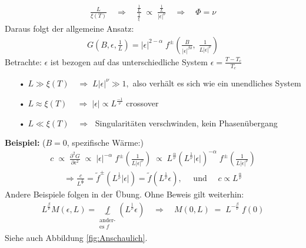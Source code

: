 \documentclass[12pt]{article}
\begin{document}
\begin{align}
\frac{L}{\xi(T)} \quad \Rightarrow \quad \frac{\frac{1}{L}}{\frac{1}{\xi}} \; \propto \;  \frac{\frac{1}{L}}{\vert \epsilon \vert ^\nu} \quad \Rightarrow \quad \Phi = \nu
\end{align} Daraus folgt der allgemeine Ansatz:
\begin{align}
G(B, \epsilon, \frac{1}{L}) = \vert \epsilon \vert^{2-\alpha} \;  f^\pm \left( \frac{B}{\vert \epsilon \vert ^{\beta \delta}} ,\; \frac{1}{L \vert \epsilon \vert^\nu}\right) 
\end{align}
Betrachte: $\epsilon$ ist bezogen auf das unterschiedliche System $ \epsilon = \frac{T-T_c}{T_c}$ 
\begin{itemize}
\item[•] $L \gg \xi (T) \quad \Rightarrow \; L \vert \epsilon \vert ^\nu \gg  1,$ also verhält es sich wie ein unendliches System
\item[•] $ L \approx \xi (T) \quad \, \Rightarrow \; \vert \epsilon \vert \propto L^\frac{-1}{\nu}$ crossover 
\item[•]$L\ll \xi(T) \quad \Rightarrow \;$ Singularitäten verschwinden, kein Phasenübergang

\end{itemize}
\textbf{Beispiel:} ($B=0$, spezifische Wärme:) 
\begin{align*}
c \; \propto \;  \frac{\partial^2 G}{\partial \epsilon^2} \; \propto \; \vert \epsilon \vert^{-\alpha} \;  f^\pm \left( \frac{1}{L \vert \epsilon \vert^\nu}\right) 
\; \propto \;  L^\frac{\alpha}{\nu} (L^\frac{1}{\nu} \vert \epsilon \vert)^{-\alpha} \; f^\pm \left( \frac{1}{L \vert \epsilon \vert ^\nu }\right) 
\end{align*}
\begin{align*}
\Rightarrow \frac{c}{L^\frac{\alpha}{\nu}} = \tilde{f}^\pm \left( L^\frac{1}{\nu} \vert \epsilon \vert \right) = \tilde{f} \left( L^\frac{1}{\nu} \epsilon \right), \quad \mbox{ und } \quad c \propto L^\frac{\alpha}{\nu} \tag{bei $T_c$}
\end{align*} 
Andere Beispiele folgen in der Übung. 
Ohne Beweis gilt weiterhin: 
\begin{align*}
L^\frac{\beta}{\nu} M(\epsilon,L)=\underbrace{f}_{\substack{\text{ander-} \\ \text{es $f$}}}(L^\frac{1}{\nu} \epsilon) \quad \Rightarrow \quad M(0,L) \; = \; L^{-\frac{\beta}{\nu}} \; f(0)
\end{align*}
Siehe auch Abbildung \ref{fig:Anschaulich}. 
\end{document}
